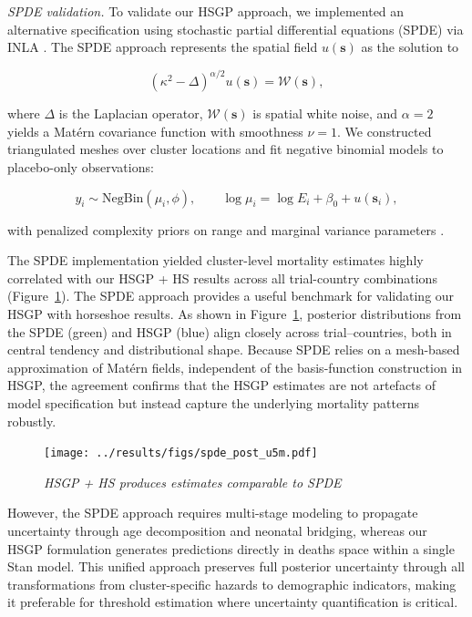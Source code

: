 \documentclass[11pt]{article}\usepackage[]{graphicx}\usepackage[]{xcolor}
\begin{document}
\newpage
\emph{SPDE validation.} To validate our HSGP approach, we implemented an alternative specification using stochastic partial differential equations (SPDE) via INLA \citep{lindgren2011explicit, lindgren2015bayesian}. The SPDE approach represents the spatial field $u(\mathbf{s})$ as the solution to

\[
(\kappa^2 - \Delta)^{\alpha/2} u(\mathbf{s}) = \mathcal{W}(\mathbf{s}),
\]

where $\Delta$ is the Laplacian operator, $\mathcal{W}(\mathbf{s})$ is spatial white noise, and $\alpha = 2$ yields a Matérn covariance function with smoothness $\nu = 1$. We constructed triangulated meshes over cluster locations and fit negative binomial models to placebo-only observations:

\[
y_i \sim \mathrm{NegBin}(\mu_i, \phi), \qquad \log \mu_i = \log E_i + \beta_0 + u(\mathbf{s}_i),
\]

with penalized complexity priors on range and marginal variance parameters \citep{fuglstad2019pcgrf}.

The SPDE implementation yielded cluster-level mortality estimates highly correlated with our HSGP + HS results across all trial-country combinations (Figure~\ref{fig:spde-post-u5m}). The SPDE approach provides a useful benchmark for validating our HSGP with horseshoe results. As shown in Figure~\ref{fig:spde-post-u5m}, posterior distributions from the SPDE (green) and HSGP (blue) align closely across trial–countries, both in central tendency and distributional shape. Because SPDE relies on a mesh-based approximation of Matérn fields, independent of the basis-function construction in HSGP, the agreement confirms that the HSGP estimates are not artefacts of model specification but instead capture the underlying mortality patterns robustly.

\begin{figure}[!h]
\centering
\texttt{[image: ../results/figs/spde\_post\_u5m.pdf]}
\caption{\emph{HSGP + HS produces estimates comparable to SPDE}}
\label{fig:spde-post-u5m}
\end{figure}

However, the SPDE approach requires multi-stage modeling to propagate uncertainty through age decomposition and neonatal bridging, whereas our HSGP formulation generates predictions directly in deaths space within a single Stan model. This unified approach preserves full posterior uncertainty through all transformations from cluster-specific hazards to demographic indicators, making it preferable for threshold estimation where uncertainty quantification is critical.
\end{document}
